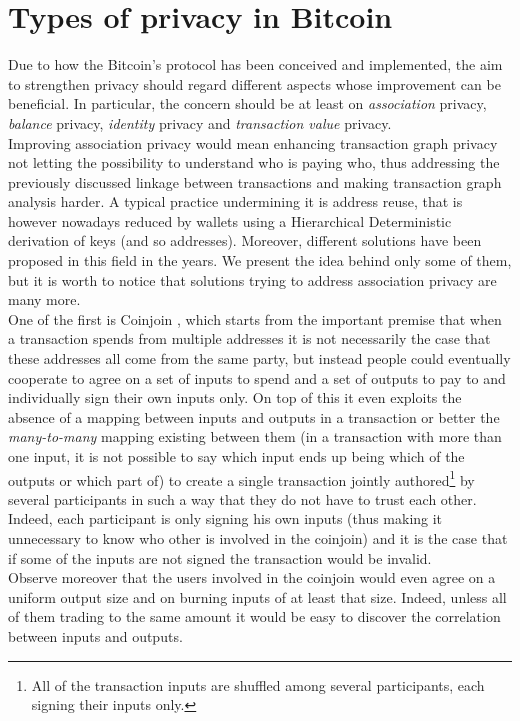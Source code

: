 \section{Types of privacy in Bitcoin}
\label{sec::priv_1}
Due to how the Bitcoin's protocol has been conceived and implemented, the aim to strengthen privacy should regard different aspects whose improvement can be beneficial. In particular, the concern should be at least on \textit{association} privacy, \textit{balance} privacy, \textit{identity} privacy and \textit{transaction value} privacy.\\
Improving association privacy would mean enhancing transaction graph privacy not letting the possibility to understand who is paying who, thus addressing the previously discussed linkage between transactions and making transaction graph analysis harder. A typical practice undermining it is address reuse, that is however nowadays reduced by wallets using a Hierarchical Deterministic derivation of keys (and so addresses). Moreover, different solutions have been proposed in this field in the years. We present the idea behind only some of them, but it is worth to notice that solutions trying to address association privacy are many more.\\ One of the first is Coinjoin \cite{Max13}, which starts from the important premise that when a transaction spends from multiple addresses it is not necessarily the case that these addresses all come from the same party, but instead people could eventually cooperate to agree on a set of inputs to spend and a set of outputs to pay to and individually sign their own inputs only. On top of this it even exploits the absence of a mapping between inputs and outputs in a transaction or better the \textit{many-to-many} mapping existing between them (in a transaction with more than one input, it is not possible to say which input ends up being which of the outputs or which part of) to create a single transaction jointly authored\footnote{All of the transaction inputs are shuffled among several participants, each signing their inputs only.} by several participants in such a way that they do not have to trust each other. Indeed, each participant is only signing his own inputs (thus making it unnecessary to know who other is involved in the coinjoin) and it is the case that if some of the inputs are not signed the transaction would be invalid.\\
Observe moreover that the users involved in the coinjoin would even agree on a uniform output size and on burning inputs of at least that size. Indeed, unless all of them trading to the same amount it would be easy to discover the correlation between inputs and outputs.\\ 
